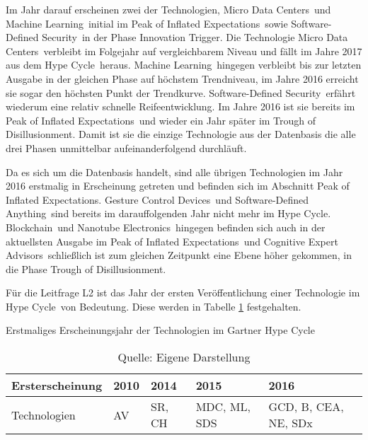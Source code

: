 Im Jahr darauf erscheinen zwei der Technologien, \glqq Micro Data Centers\grqq~und \glqq Machine Learning\grqq~initial im \glqq Peak of Inflated Expectations\grqq~sowie \glqq Software-Defined Security\grqq~in der Phase \glqq Innovation Trigger\grqq. Die Technologie \glqq Micro Data Centers\grqq~verbleibt im Folgejahr auf vergleichbarem Niveau und fällt im Jahre 2017 aus dem \glqq Hype Cycle\grqq~heraus. \glqq Machine Learning\grqq~hingegen verbleibt bis zur letzten Ausgabe in der gleichen Phase auf höchstem Trendniveau, im Jahre 2016 erreicht sie sogar den höchsten Punkt der Trendkurve. \glqq Software-Defined Security\grqq~erfährt wiederum eine relativ schnelle Reife\-entwicklung. Im Jahre 2016 ist sie bereits im \glqq Peak of Inflated Expectations\grqq~und wieder ein Jahr später im \glqq Trough of Disillusionment\grqq. Damit ist sie die einzige Technologie aus der Datenbasis die alle drei Phasen unmittelbar aufeinanderfolgend durchläuft.

Da es sich um die Datenbasis handelt, sind alle übrigen Technologien im Jahr 2016 erstmalig in Erscheinung getreten und befinden sich im Abschnitt \glqq Peak of Inflated Expectations\grqq. \glqq Gesture Control Devices\grqq~und \glqq Software-Defined Anything\grqq~sind bereits im darauffolgenden Jahr nicht mehr im \glqq Hype Cycle\grqq. \glqq Blockchain\grqq~und \glqq Nanotube Electronics\grqq~hingegen befinden sich auch in der aktuellsten Ausgabe im \glqq Peak of Inflated Expectations\grqq~und \glqq Cognitive Expert Advisors\grqq~schließlich ist zum gleichen Zeitpunkt eine Ebene höher gekommen, in die Phase \glqq Trough of Disillusionment\grqq.

Für die Leitfrage L2 ist das Jahr der ersten Veröffentlichung einer Technologie im \glqq Hype Cycle\grqq~von Bedeutung. Diese werden in Tabelle \ref{tab:ghc_init} festgehalten.

\begin{table}
	\caption{Erstmaliges Erscheinungsjahr der Technologien im \glqq Gartner Hype Cycle\grqq}
	\selectfont
	\centering
	\label{tab:ghc_init}
	\begin{tabularx}{\linewidth}{X|p{3em}XXX}
	Erst\-erscheinung & 2010 & 2014 & 2015 & 2016 \\
	\hline
	Technologien & \acs{AV} & \acs{SR}, \acs{CH} & \acs{MDC}, \acs{ML}, \acs{SDS} & \acs{GCD}, \acs{B}, \acs{CEA}, \acs{NE}, \acs{SDx} \\
	\end{tabularx}
	\caption*{Quelle: Eigene Darstellung}
\end{table}

